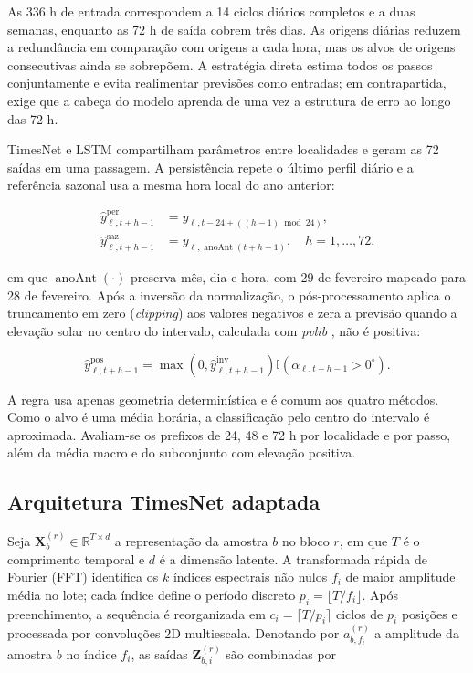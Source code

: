 \documentclass[10pt,conference,a4paper]{IEEEtran}
\begin{document}
As 336 h de entrada correspondem a 14 ciclos diários completos e a duas
semanas, enquanto as 72 h de saída cobrem três dias. As origens diárias
reduzem a redundância em comparação com origens a cada hora, mas os alvos de
origens consecutivas ainda se sobrepõem. A estratégia direta estima todos os
passos conjuntamente e evita realimentar previsões como entradas; em
contrapartida, exige que a cabeça do modelo aprenda de uma vez a estrutura de
erro ao longo das 72 h.

TimesNet e LSTM compartilham parâmetros entre localidades e geram as 72 saídas
em uma passagem. A persistência repete o último perfil diário e a referência
sazonal usa a mesma hora local do ano anterior:

\begin{align}
 \widehat y^{\mathrm{per}}_{\ell,t+h-1}
 &=y_{\ell,t-24+((h-1)\bmod 24)},\label{eq:persistencia}\\
 \widehat y^{\mathrm{saz}}_{\ell,t+h-1}
 &=y_{\ell,\operatorname{anoAnt}(t+h-1)},\quad h=1,\ldots,72.
 \label{eq:sazonal}
\end{align}

\noindent em que $\operatorname{anoAnt}(\cdot)$ preserva mês, dia e hora, com
29 de fevereiro mapeado para 28 de fevereiro. Após a inversão da normalização,
o pós-processamento aplica o truncamento em zero (\textit{clipping}) aos valores negativos e
zera a previsão quando a elevação solar no centro do intervalo, calculada com
\textit{pvlib}
\cite{anderson2023}, não é positiva:

\begin{equation}
 \widehat y^{\mathrm{pos}}_{\ell,t+h-1}
 =\max\!\left(0,\widehat y^{\mathrm{inv}}_{\ell,t+h-1}\right)
  \mathbb I\!\left(\alpha_{\ell,t+h-1}>0^\circ\right).
 \label{eq:posprocessamento}
\end{equation}

\noindent A regra usa apenas geometria determinística e é comum aos quatro
métodos. Como o alvo é uma média horária, a classificação pelo centro do
intervalo é aproximada. Avaliam-se os prefixos de 24, 48 e 72 h por localidade
e por passo, além da média macro e do subconjunto com elevação positiva.

\subsection{Arquitetura TimesNet adaptada}

Seja $\mathbf X_b^{(r)}\in\mathbb R^{T\times d}$ a representação da amostra
$b$ no bloco $r$, em que $T$ é o comprimento temporal e $d$ é a dimensão
latente. A transformada rápida de Fourier (FFT) identifica os $k$ índices
espectrais não nulos $f_i$ de maior amplitude média no lote; cada índice
define o período discreto $p_i=\lfloor T/f_i\rfloor$. Após preenchimento, a
sequência é reorganizada em
$c_i=\lceil T/p_i\rceil$ ciclos de $p_i$ posições e processada por convoluções
2D multiescala. Denotando por $a_{b,f_i}^{(r)}$ a amplitude da amostra $b$ no
índice $f_i$, as saídas $\mathbf Z_{b,i}^{(r)}$ são combinadas por
\end{document}
